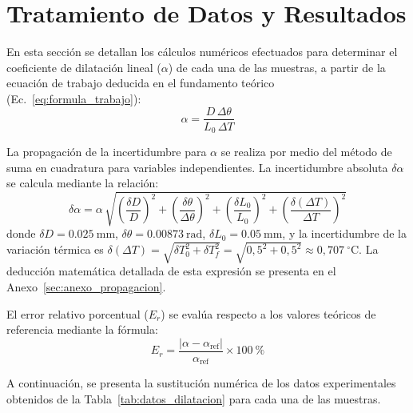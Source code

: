 
\section{Tratamiento de Datos y Resultados}
\label{sec:tratamiento}

En esta sección se detallan los cálculos numéricos efectuados para determinar el coeficiente de dilatación lineal ($\alpha$) de cada una de las muestras, a partir de la ecuación de trabajo deducida en el fundamento teórico (Ec.~\eqref{eq:formula_trabajo}):
\begin{equation}
    \alpha = \frac{D\,\Delta\theta}{L_0\,\Delta T}
    \label{eq:trabajo_calculo}
\end{equation}

La propagación de la incertidumbre para $\alpha$ se realiza por medio del método de suma en cuadratura para variables independientes. La incertidumbre absoluta $\delta\alpha$ se calcula mediante la relación:
\begin{equation}
    \delta\alpha = \alpha\,\sqrt{
        \left(\frac{\delta D}{D}\right)^2 +
        \left(\frac{\delta\theta}{\Delta\theta}\right)^2 +
        \left(\frac{\delta L_0}{L_0}\right)^2 +
        \left(\frac{\delta(\Delta T)}{\Delta T}\right)^2
    }
    \label{eq:propagacion_cuadratura}
\end{equation} 
donde $\delta D = \qty{0,025}{\milli\meter}$, $\delta\theta = \qty{0,00873}{\radian}$, $\delta L_0 = \qty{0,05}{\milli\meter}$, y la incertidumbre de la variación térmica es $\delta(\Delta T) = \sqrt{\delta T_0^2 + \delta T_f^2} = \sqrt{0{,}5^2 + 0{,}5^2} \approx 0{,}707\ ^\circ\text{C}$. La deducción matemática detallada de esta expresión se presenta en el Anexo~\ref{sec:anexo_propagacion}.

El error relativo porcentual ($E_r$) se evalúa respecto a los valores teóricos de referencia mediante la fórmula:
\begin{equation}
    E_r = \frac{|\alpha - \alpha_{\text{ref}}|}{\alpha_{\text{ref}}} \times \qty{100}{\percent}
    \label{eq:error_relativo}
\end{equation}

A continuación, se presenta la sustitución numérica de los datos experimentales obtenidos de la Tabla~\ref{tab:datos_dilatacion} para cada una de las muestras.

